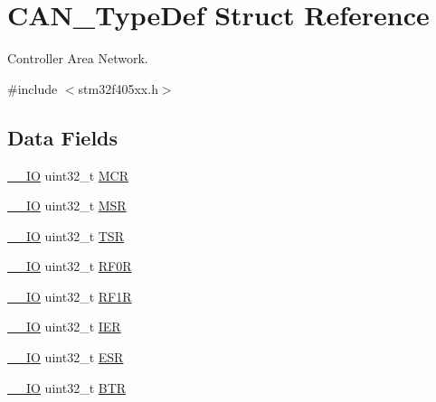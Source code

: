 \hypertarget{struct_c_a_n___type_def}{}\section{C\+A\+N\+\_\+\+Type\+Def Struct Reference}
\label{struct_c_a_n___type_def}


Controller Area Network.  




{\ttfamily \#include $<$stm32f405xx.\+h$>$}

\subsection*{Data Fields}
\begin{DoxyCompactItemize}
\item 
\hyperlink{core__sc300_8h_aec43007d9998a0a0e01faede4133d6be}{\+\_\+\+\_\+\+IO} uint32\+\_\+t \hyperlink{struct_c_a_n___type_def_a27af4e9f888f0b7b1e8da7e002d98798}{M\+CR}
\item 
\hyperlink{core__sc300_8h_aec43007d9998a0a0e01faede4133d6be}{\+\_\+\+\_\+\+IO} uint32\+\_\+t \hyperlink{struct_c_a_n___type_def_acdd4c1b5466be103fb2bb2a225b1d3a9}{M\+SR}
\item 
\hyperlink{core__sc300_8h_aec43007d9998a0a0e01faede4133d6be}{\+\_\+\+\_\+\+IO} uint32\+\_\+t \hyperlink{struct_c_a_n___type_def_a87e3001757a0cd493785f1f3337dd0e8}{T\+SR}
\item 
\hyperlink{core__sc300_8h_aec43007d9998a0a0e01faede4133d6be}{\+\_\+\+\_\+\+IO} uint32\+\_\+t \hyperlink{struct_c_a_n___type_def_accf4141cee239380d0ad4634ee21dbf6}{R\+F0R}
\item 
\hyperlink{core__sc300_8h_aec43007d9998a0a0e01faede4133d6be}{\+\_\+\+\_\+\+IO} uint32\+\_\+t \hyperlink{struct_c_a_n___type_def_a02b589bb589df4f39e549dca4d5abb08}{R\+F1R}
\item 
\hyperlink{core__sc300_8h_aec43007d9998a0a0e01faede4133d6be}{\+\_\+\+\_\+\+IO} uint32\+\_\+t \hyperlink{struct_c_a_n___type_def_a6566f8cfbd1d8aa7e8db046aa35e77db}{I\+ER}
\item 
\hyperlink{core__sc300_8h_aec43007d9998a0a0e01faede4133d6be}{\+\_\+\+\_\+\+IO} uint32\+\_\+t \hyperlink{struct_c_a_n___type_def_a2b39f943954e0e7d177b511d9074a0b7}{E\+SR}
\item 
\hyperlink{core__sc300_8h_aec43007d9998a0a0e01faede4133d6be}{\+\_\+\+\_\+\+IO} uint32\+\_\+t \hyperlink{struct_c_a_n___type_def_a5c0fcd3e7b4c59ab1dd68f6bd8f74e07}{B\+TR}
\item 

\end{DoxyCompactItemize}
